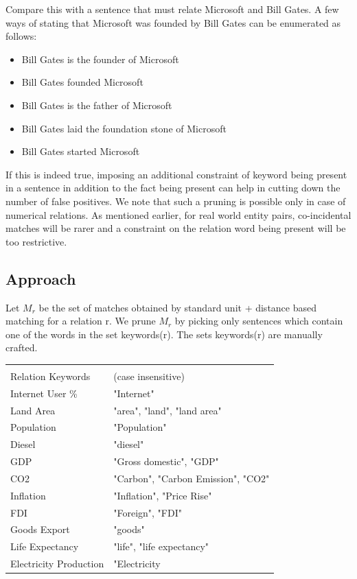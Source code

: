\documentclass[a4paper,10pt]{article}
\begin{document}
Compare this with a sentence that must relate Microsoft and Bill Gates. A few ways of stating that
Microsoft was founded by Bill Gates can be enumerated as follows:
\begin{itemize}
\item Bill Gates is the founder of Microsoft
\item Bill Gates founded Microsoft
\item Bill Gates is the father of Microsoft
\item Bill Gates laid the foundation stone of Microsoft
\item Bill Gates started Microsoft
\end{itemize}

If this is indeed true, imposing an additional constraint of keyword being present in a sentence in
addition to the fact being present can help in cutting down the number of false positives. We note
that such a pruning is possible only in case of numerical relations. As mentioned earlier, for real
world entity pairs, co-incidental matches will be rarer and a constraint on the relation word being
present will be too restrictive.
\subsection{Approach}
Let $M_r$ be the set of matches obtained by standard unit + distance based matching for a relation r.
We prune $M_r$ by picking only sentences which contain one of the words in the set keywords(r).
The sets keywords(r) are manually crafted.

\begin{center}
 \begin{tabular}{|l|l|}
\hline \\
 Relation Keywords & (case insensitive)\\
\hline
 Internet User \% &"Internet"\\
Land Area &"area", "land", "land area"\\
Population &"Population"\\
Diesel &"diesel"\\
GDP &"Gross domestic", "GDP"\\
CO2 &"Carbon", "Carbon Emission", "CO2"\\
Inflation &"Inflation", "Price Rise"\\
FDI &"Foreign", "FDI"\\
Goods Export & "goods"\\
Life Expectancy & "life", "life expectancy"\\
Electricity Production & "Electricity\\
\hline
\end{tabular}
 \end{center}
\end{document}

